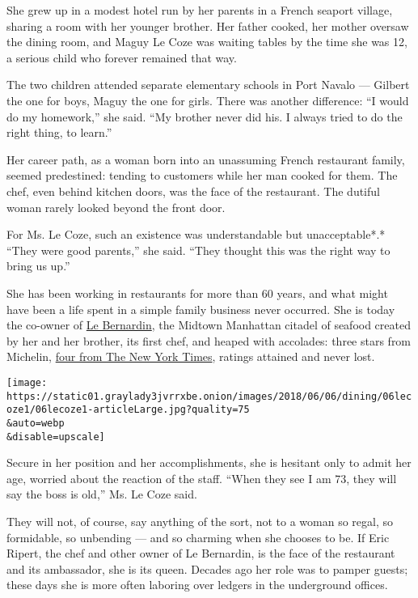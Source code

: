 She grew up in a modest hotel run by her parents in a French seaport
village, sharing a room with her younger brother. Her father cooked, her
mother oversaw the dining room, and Maguy Le Coze was waiting tables by
the time she was 12, a serious child who forever remained that way.

The two children attended separate elementary schools in Port Navalo ---
Gilbert the one for boys, Maguy the one for girls. There was another
difference: ``I would do my homework,'' she said. ``My brother never did
his. I always tried to do the right thing, to learn.''

Her career path, as a woman born into an unassuming French restaurant
family, seemed predestined: tending to customers while her man cooked
for them. The chef, even behind kitchen doors, was the face of the
restaurant. The dutiful woman rarely looked beyond the front door.

For Ms. Le Coze, such an existence was understandable but
unacceptable*.* ``They were good parents,'' she said. ``They thought
this was the right way to bring us up.''

She has been working in restaurants for more than 60 years, and what
might have been a life spent in a simple family business never occurred.
She is today the co-owner of \href{https://www.le-bernardin.com/}{Le
Bernardin}, the Midtown Manhattan citadel of seafood created by her and
her brother, its first chef, and heaped with accolades: three stars from
Michelin,
\href{https://www.nytimes3xbfgragh.onion/2012/05/23/dining/reviews/le-bernardin-in-midtown-manhattan.html}{four
from The New York Times}, ratings attained and never lost.

\texttt{[image: https://static01.graylady3jvrrxbe.onion/images/2018/06/06/dining/06lecoze1/06lecoze1-articleLarge.jpg?quality=75\\\&auto=webp\\\&disable=upscale]}

Secure in her position and her accomplishments, she is hesitant only to
admit her age, worried about the reaction of the staff. ``When they see
I am 73, they will say the boss is old,'' Ms. Le Coze said.

They will not, of course, say anything of the sort, not to a woman so
regal, so formidable, so unbending --- and so charming when she chooses
to be. If Eric Ripert, the chef and other owner of Le Bernardin, is the
face of the restaurant and its ambassador, she is its queen. Decades ago
her role was to pamper guests; these days she is more often laboring
over ledgers in the underground offices.

